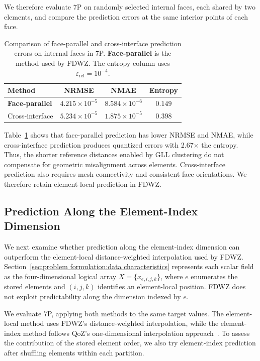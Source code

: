 We therefore evaluate 7P on randomly selected internal faces, each shared by two elements, and compare the prediction errors at the same interior points of each face.

\begin{table}[htb]
    \centering
    \caption{Comparison of face-parallel and cross-interface prediction errors on internal faces in 7P. \textbf{Face-parallel} is the method used by FDWZ. The entropy column uses $\varepsilon_{\mathrm{rel}}=10^{-4}$.}
    \label{tab:cross-interface-prediction}
    \footnotesize
    \setlength{\tabcolsep}{3pt}
    \begin{tabular*}{\columnwidth}{@{\extracolsep{\fill}}lccc@{}}
        \toprule
        Method & NRMSE & NMAE & Entropy \\
        \midrule
        \textbf{Face-parallel} & $4.215\times10^{-5}$ & $8.584\times10^{-6}$ & $0.149$ \\
        Cross-interface & $5.234\times10^{-5}$ & $1.875\times10^{-5}$ & $0.398$ \\
        \bottomrule
    \end{tabular*}
\end{table}

Table~\ref{tab:cross-interface-prediction} shows that face-parallel prediction has lower NRMSE and NMAE, while cross-interface prediction produces quantized errors with 2.67$\times$ the entropy. Thus, the shorter reference distances enabled by GLL clustering do not compensate for geometric misalignment across elements. Cross-interface prediction also requires mesh connectivity and consistent face orientations. We therefore retain element-local prediction in FDWZ.

\subsection{Prediction Along the Element-Index Dimension}\label{sec:FDWZ:element-index-dimension}

We next examine whether prediction along the element-index dimension can outperform the element-local distance-weighted interpolation used by FDWZ. Section~\ref{sec:problem formulation:data characteristics} represents each scalar field as the four-dimensional logical array $X=\{x_{e,i,j,k}\}$, where $e$ enumerates the stored elements and $(i,j,k)$ identifies an element-local position. FDWZ does not exploit predictability along the dimension indexed by $e$.

We evaluate 7P, applying both methods to the same target values. The element-local method uses FDWZ's distance-weighted interpolation, while the element-index method follows QoZ's one-dimensional interpolation approach~\cite{liu2024high}. To assess the contribution of the stored element order, we also try element-index prediction after shuffling elements within each partition.

